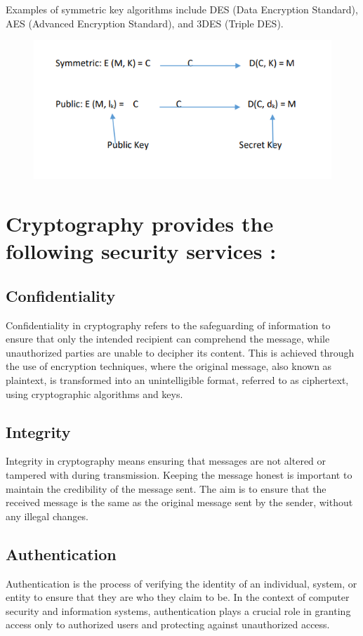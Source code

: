 \documentclass[11pt]{article}
\begin{document}
Examples of symmetric key algorithms include DES (Data Encryption Standard), AES (Advanced Encryption Standard), and 3DES (Triple DES).
\\
\begin{figure}
\centering
\includegraphics[width=0.8\linewidth]{image1.PNG}
\end{figure}

\section{Cryptography provides the following security services :}
\subsection{Confidentiality}
Confidentiality in cryptography refers to the safeguarding of information to ensure that only the intended recipient can comprehend the message, while unauthorized parties are unable to decipher its content. This is achieved through the use of encryption techniques, where the original message, also known as plaintext, is transformed into an unintelligible format, referred to as ciphertext, using cryptographic algorithms and keys.

\subsection{Integrity}
Integrity in cryptography means ensuring that messages are not altered or tampered with during transmission. Keeping the message honest is important to maintain the credibility of the message sent. The aim is to ensure that the received message is the same as the original message sent by the sender, without any illegal changes.

\subsection{Authentication}
Authentication is the process of verifying the identity of an individual, system, or entity to ensure that they are who they claim to be. In the context of computer security and information systems, authentication plays a crucial role in granting access only to authorized users and protecting against unauthorized access.
\end{document}
